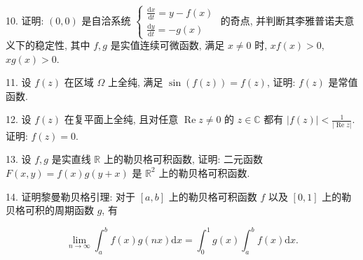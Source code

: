 \documentclass{examcollection}
\renewcommand{\displayformula}[1]{\[#1\]}
\begin{document}
{\begin{minipage}{\textwidth}
10. 证明: $(0,0)$ 是自洽系统 $\left\{ \begin{array}{l} \frac{\mathrm{d}x}{\mathrm{d}t} = y - f(x) \\ \frac{\mathrm{d}y}{\mathrm{d}t} = -g(x) \end{array} \right.$ 的奇点, 并判断其李雅普诺夫意义下的稳定性, 其中 $f, g$ 是实值连续可微函数, 满足 $x \neq 0$ 时, $xf(x) > 0$, $xg(x) > 0$.\par
11. 设 $f(z)$ 在区域 $\Omega$ 上全纯, 满足 $\sin (f(z)) = f(z)$, 证明: $f(z)$ 是常值函数.\par
12. 设 $f(z)$ 在复平面上全纯, 且对任意 $\operatorname{Re} z \neq 0$ 的 $z \in \mathbb{C}$ 都有 $|f(z)| < \frac{1}{|\operatorname{Re} z|}$. 证明: $f(z) = 0$.\par
13. 设 $f, g$ 是实直线 $\mathbb{R}$ 上的勒贝格可积函数, 证明: 二元函数 $F(x, y) = f(x)g(y + x)$ 是 $\mathbb{R}^2$ 上的勒贝格可积函数.\par
14. 证明黎曼勒贝格引理: 对于 $[a, b]$ 上的勒贝格可积函数 $f$ 以及 $[0, 1]$ 上的勒贝格可积的周期函数 $g$, 有\par
\displayformula{\lim _ {n \rightarrow \infty} \int_ {a} ^ {b} f (x) g (n x) \mathrm{d} x = \int_ {0} ^ {1} g (x) \int_ {a} ^ {b} f (x) \mathrm{d} x.}\par
\end{minipage}}
\ifdim\dimexpr\ht\proofbox+\dp\proofbox\relax>\textheight
\noindent\resizebox{!}{\textheight}{\usebox{\proofbox}}\else\noindent\usebox{\proofbox}\fi\clearpage
\end{document}
